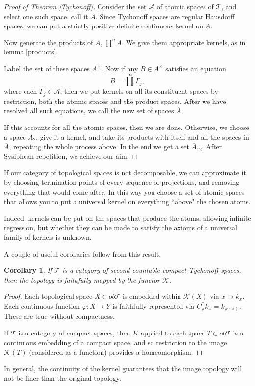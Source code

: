 \documentclass[12pt]{amsart}
\newtheorem{corollary}{Corollary}[theorem]
\theoremstyle{definition}
\numberwithin{equation}{section}
\begin{document}
\begin{proof}[Proof of Theorem \ref{Tychonoff}]
    
    Consider the set $\mathcal A$ of atomic spaces of $\mathcal T$, and select one such space, call it $A$. Since Tychonoff spaces are regular Hausdorff spaces, we can put a strictly positive definite continuous kernel on $A$.

    Now generate the products of $A$, $\prod^nA$. We give them appropriate kernels, as in lemma \ref{products}.

    Label the set of these spaces $A^\times$. Now if any $B \in A^\times$ satisfies an equation \[B = \prod^\infty\Gamma_j,\] where each $\Gamma_j \in \mathcal A$, then we put kernels on all its constituent spaces by restriction, both the atomic spaces and the product spaces. After we have resolved all such equations, we call the new set of spaces $\overline A$. 
    
    If this accounts for all the atomic spaces, then we are done. Otherwise, we choose a space $A_2$, give it a kernel, and take its products with itself and all the spaces in $\overline A$, repeating the whole process above. In the end we get a set $\overline A_{12}$. After Sysiphean repetition, we achieve our aim. 
\end{proof}


If our category of topological spaces is not decomposable, we can approximate it by choosing termination points of every sequence of projections, and removing everything that would come after. In this way you choose a set of atomic spaces that allows you to put a universal kernel on everything ``above" the chosen atoms.

Indeed, kernels can be put on the spaces that produce the atoms, allowing infinite regression, but whether they can be made to satisfy the axioms of a universal family of kernels is unknown. 


A couple of useful corollaries follow from this result. 

\begin{corollary}
    If $\mathcal T$ is a category of second countable compact Tychonoff spaces, then the topology is faithfully mapped by the functor $\mathcal K$. 
\end{corollary}
\begin{proof}
    Each topological space $X \in ob\mathcal T$ is embedded within $\mathcal K(X)$ via $x\mapsto k_x$. Each continuous function $\varphi: X \rightarrow Y$ is faithfully represented via $C^*_\varphi k_x = k_{\varphi(x)}$. These are true without compactness. 

    If $\mathcal T$ is a category of compact spaces, then $K$ applied to each space $T \in ob\mathcal T$ is a continuous embedding of a compact space, and so restriction to the image $\mathcal K(T)$ (considered as a function) provides a homeomorphism. 
\end{proof}
In general, the continuity of the kernel guarantees that the image topology will not be finer than the original topology. 
\end{document}
